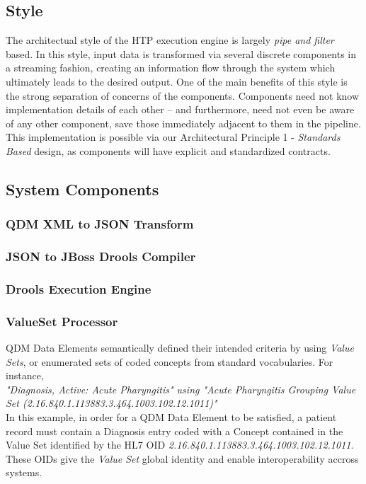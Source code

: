 \documentclass{amia}
\begin{document}
\subsection*{Style}
The architectual style of the HTP execution engine is largely \textit{pipe and filter} based. In this style, input data is transformed via several discrete components in a streaming fashion, creating an information flow through the system which ultimately leads to the desired output\cite{garlan1993introduction}. One of the main benefits of this style is the strong separation of concerns of the components. Components need not know implementation details of each other -- and furthermore, need not even be aware of any other component, save those immediately adjacent to them in the pipeline. This implementation is possible via our Architectural Principle 1 - \textit{Standards Based} design, as components will have explicit and standardized contracts.

\subsection*{System Components}
\subsubsection{QDM XML to JSON Transform}
\subsubsection{JSON to JBoss Drools Compiler}
\subsubsection{Drools Execution Engine}
\subsubsection{ValueSet Processor}
QDM Data Elements semantically defined their intended criteria by using \textit{Value Sets}, or enumerated sets of coded concepts from standard vocabularies. For instance,\\

\textit{"Diagnosis, Active: Acute Pharyngitis" using "Acute Pharyngitis Grouping Value Set (2.16.840.1.113883.3.464.1003.102.12.1011)"}\\

In this example, in order for a QDM Data Element to be satisfied, a patient record must contain a Diagnosis entry coded with a Concept contained in the Value Set identified by the HL7 OID \textit{2.16.840.1.113883.3.464.1003.102.12.1011}. These OIDs give the \textit{Value Set} global identity and enable interoperability accross systems\cite{steindel2010oids}.
\end{document}
